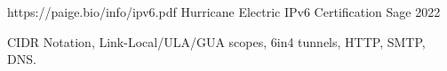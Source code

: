 \begin{cventries}
  \cventry
    {https://paige.bio/info/ipv6.pdf}
    {Hurricane Electric IPv6 Certification}
    {Sage}
    {2022}
    {
      \begin{cvitems} 
        \item{CIDR Notation, Link-Local/ULA/GUA scopes, 6in4 tunnels, HTTP, SMTP, DNS.}    
      \end{cvitems}
    }
\end{cventries}

